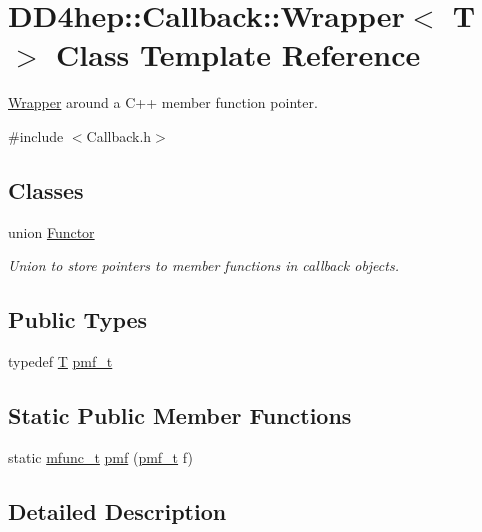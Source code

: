 \hypertarget{class_d_d4hep_1_1_callback_1_1_wrapper}{
\section{DD4hep::Callback::Wrapper$<$ T $>$ Class Template Reference}
\label{class_d_d4hep_1_1_callback_1_1_wrapper}
}


\hyperlink{class_d_d4hep_1_1_callback_1_1_wrapper}{Wrapper} around a C++ member function pointer.  


{\ttfamily \#include $<$Callback.h$>$}\subsection*{Classes}
\begin{DoxyCompactItemize}
\item 
union \hyperlink{union_d_d4hep_1_1_callback_1_1_wrapper_1_1_functor}{Functor}
\begin{DoxyCompactList}\small\item\em Union to store pointers to member functions in callback objects. \item\end{DoxyCompactList}\end{DoxyCompactItemize}
\subsection*{Public Types}
\begin{DoxyCompactItemize}
\item 
typedef \hyperlink{class_t}{T} \hyperlink{class_d_d4hep_1_1_callback_1_1_wrapper_ab266379df9f395d1221b2adbf62b112c}{pmf\_\-t}
\end{DoxyCompactItemize}
\subsection*{Static Public Member Functions}
\begin{DoxyCompactItemize}
\item 
static \hyperlink{struct_d_d4hep_1_1_callback_1_1mfunc__t}{mfunc\_\-t} \hyperlink{class_d_d4hep_1_1_callback_1_1_wrapper_a99e377622ec6bc663c3165a504b5011b}{pmf} (\hyperlink{class_t}{pmf\_\-t} f)
\end{DoxyCompactItemize}


\subsection{Detailed Description}
